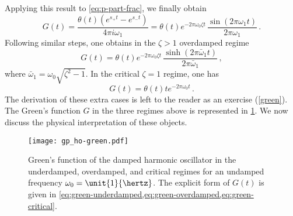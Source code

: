 Applying this result to \cref{eq:p-part-frac}, we finally obtain
\begin{equation}
  G(t)=\frac{\theta(t)(e^{s_+t}-e^{s_-t})}{4\pi i\omega_1}
  =\theta(t)e^{-2\pi\omega_0\zeta t}\,\frac{\sin(2\pi\omega_1t)}{2\pi\omega_1}\,.
  \label{eq:green-underdamped}
\end{equation}
Following similar steps, one obtains in the $\zeta>1$ overdamped regime
\begin{equation}
  G(t)=\theta(t)e^{-2\pi\omega_0\zeta t}\,
  \frac{\sinh(2\pi\bar{\omega}_1t)}{2\pi\bar{\omega}_1}\,,
  \label{eq:green-overdamped}
\end{equation}
where $\bar{\omega}_1=\omega_0\sqrt{\zeta^2-1}$. In the critical $\zeta=1$ regime, one has
\begin{equation}
  G(t)=\theta(t)te^{-2\pi\omega_0 t}\,.
  \label{eq:green-critical}
\end{equation}
The derivation of these extra cases is left to the reader as an exercise
(\cf\cref{green}). The Green's function $G$ in the three regimes above is represented in
\cref{fig:ho-green}. We now discuss the physical interpretation of these objects.
\begin{figure}[t]
  \centering
  \texttt{[image: gp\_ho-green.pdf]}
  \caption{Green's function of the damped harmonic oscillator in the underdamped,
    overdamped, and critical regimes for an undamped frequency $\omega_0=\unit{1}{\hertz}$.
    The explicit form of $G(t)$ is given in
  \cref{eq:green-underdamped,eq:green-overdamped,eq:green-critical}.}
  \label{fig:ho-green}
\end{figure}
